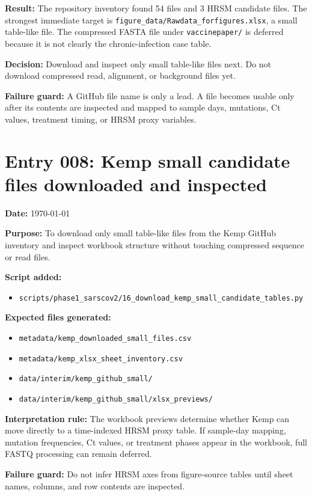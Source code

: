 \textbf{Result:} The repository inventory found 54 files and 3 HRSM candidate files. The strongest immediate target is \texttt{figure\_data/Rawdata\_forfigures.xlsx}, a small table-like file. The compressed FASTA file under \texttt{vaccinepaper/} is deferred because it is not clearly the chronic-infection case table.

\textbf{Decision:} Download and inspect only small table-like files next. Do not download compressed read, alignment, or background files yet.

\textbf{Failure guard:} A GitHub file name is only a lead. A file becomes usable only after its contents are inspected and mapped to sample days, mutations, Ct values, treatment timing, or HRSM proxy variables.


\section*{Entry 008: Kemp small candidate files downloaded and inspected}

\textbf{Date:} \today

\textbf{Purpose:} To download only small table-like files from the Kemp GitHub inventory and inspect workbook structure without touching compressed sequence or read files.

\textbf{Script added:}
\begin{itemize}
    \item \texttt{scripts/phase1\_sarscov2/16\_download\_kemp\_small\_candidate\_tables.py}
\end{itemize}

\textbf{Expected files generated:}
\begin{itemize}
    \item \texttt{metadata/kemp\_downloaded\_small\_files.csv}
    \item \texttt{metadata/kemp\_xlsx\_sheet\_inventory.csv}
    \item \texttt{data/interim/kemp\_github\_small/}
    \item \texttt{data/interim/kemp\_github\_small/xlsx\_previews/}
\end{itemize}

\textbf{Interpretation rule:} The workbook previews determine whether Kemp can move directly to a time-indexed HRSM proxy table. If sample-day mapping, mutation frequencies, Ct values, or treatment phases appear in the workbook, full FASTQ processing can remain deferred.

\textbf{Failure guard:} Do not infer HRSM axes from figure-source tables until sheet names, columns, and row contents are inspected.


